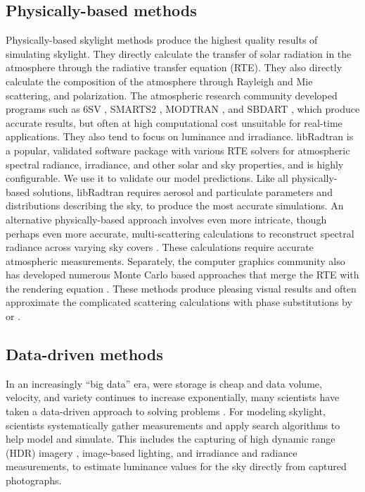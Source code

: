 \subsection{Physically-based methods}

Physically-based skylight methods produce the highest quality results of simulating skylight. They directly calculate the transfer of solar radiation in the atmosphere through the radiative transfer equation (RTE). They also directly calculate the composition of the atmosphere through Rayleigh and Mie scattering, and polarization. The atmospheric research community developed programs such as 6SV \citep{vermote_6sv}, SMARTS2 \citep{gueymard_smarts2}, MODTRAN \citep{berk_modtran}, and SBDART \citep{ricchiazzi_sbdart}, which produce accurate results, but often at high computational cost unsuitable for real-time applications. They also tend to focus on luminance and irradiance. libRadtran \citep{emde_libradtran, mayer_2005} is a popular, validated software package with various RTE solvers for atmospheric spectral radiance, irradiance, and other solar and sky properties, and is highly configurable. We use it to validate our model predictions. Like all physically-based solutions, libRadtran requires aerosol and particulate parameters and distributions \citep{hess_opac, holben_aeronet} describing the sky, to produce the most accurate simulations. An alternative physically-based approach involves even more intricate, though perhaps even more accurate, multi-scattering calculations to reconstruct spectral radiance across varying sky covers \citep{kocifaj_unified_2015, kocifaj_angular_2012, kocifaj_scattering_2009}. These calculations require accurate atmospheric measurements. Separately, the computer graphics community also has developed numerous Monte Carlo based approaches \citep{nishita_model93, nishita_model96, haber_model, jarosz_montecarlo} that merge the RTE with the rendering equation \citep{kajiya_rendering}. These methods produce pleasing visual results and often approximate the complicated scattering calculations with phase substitutions by \citet{henyey_greenstein} or \citet{cornette_shanks}.

\subsection{Data-driven methods}

In an increasingly ``big data'' era, were storage is cheap and data volume, velocity, and variety continues to increase exponentially, many scientists have taken a data-driven approach to solving problems \citep{gandomi_2015, sagiroglu_2013, chen_2012, laney_2001}. For modeling skylight, scientists systematically gather measurements and apply search algorithms to help model and simulate. This includes the capturing of high dynamic range (HDR) imagery \citep{stumpfel_2004}, image-based lighting, and irradiance and radiance measurements, to estimate luminance values for the sky directly from captured photographs.

